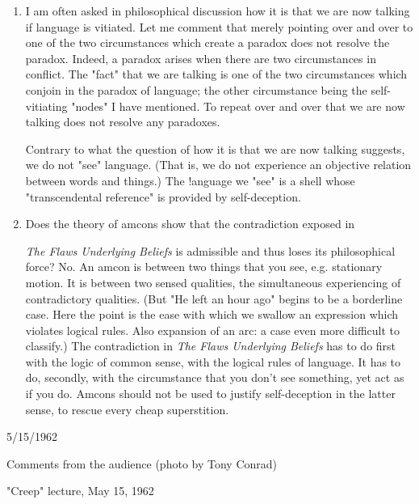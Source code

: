 \documentclass[10pt,twoside]{memoir}
\newcommand{\essaytitle}[1]{
	\emph{#1}}
\begin{document}
\begin{enumerate}
At first this suggestion may seem like another joke, a triviality. But my 
genius consists in recognizing that it is not, that there is a residue of 
non-vacuity and non-triviality in this proposal. There may be only a 
hair's-breadth of difference between the state I propose and mental 
incompetance or death---but still, there is all of a hair's-breadth. I magnify 
this hair's-breadth many times, and use it as a lever to overturn civilization. 

\item I am often asked in philosophical discussion how it is that we are 
now talking if language is vitiated. Let me comment that merely pointing 
over and over to one of the two circumstances which create a paradox does 
not resolve the paradox. Indeed, a paradox arises when there are two 
circumstances in conflict. The "fact" that we are talking is one of the two 
circumstances which conjoin in the paradox of language; the other 
circumstance being the self-vitiating "nodes" I have mentioned. To repeat 
over and over that we are now talking does not resolve any paradoxes. 

Contrary to what the question of how it is that we are now talking 
suggests, we do not "see" language. (That is, we do not experience an 
objective relation between words and things.) The !anguage we "see" is a 
shell whose "transcendental reference" is provided by self-deception. 

\item Does the theory of amcons show that the contradiction exposed in 
\essaytitle{The Flaws Underlying Beliefs} is admissible and thus loses its philosophical 
force? No. An amcon is between two things that you see, e.g. stationary 
motion. It is between two sensed qualities, the simultaneous experiencing of 
contradictory qualities. (But "He left an hour ago" begins to be a borderline 
case. Here the point is the ease with which we swallow an expression which 
violates logical rules. Also expansion of an arc: a case even more difficult to 
classify.) The contradiction in \essaytitle{The Flaws Underlying Beliefs} has to do first 
with the logic of common sense, with the logical rules of language. It has to 
do, secondly, with the circumstance that you don't see something, yet act as 
if you do. Amcons should not be used to justify self-deception in the latter 
sense, to rescue every cheap superstition. 
\end{enumerate}


{
5/15/1962 


Comments from the audience 
(photo by Tony Conrad) 


"Creep" lecture, May 15, 1962 
}
\end{document}
